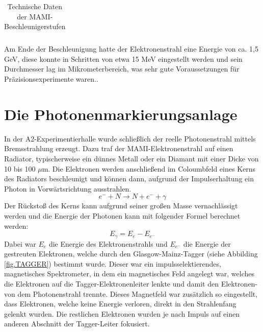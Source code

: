 \documentclass[a4paper,11pt,oneside,final,german,openbib,pdftex]{scrbook}
\begin{document}
{\begin{table}[h!]
\begin{center}
\begin{tabular}{|l|c|c|c|c|}
	
		\end{tabular}
		\caption{Technische Daten der MAMI-Beschleunigerstufen \cite{Un08}}
		\label{tab.MAMIstufen}
	\end{center}
\end{table}

 Am Ende der Beschleunigung hatte der Elektronenstrahl eine Energie von ca. 1,5 GeV, diese konnte in Schritten von etwa 15 MeV eingestellt werden und sein Durchmesser lag im Mikrometerbereich, was sehr gute Voraussetzungen f\"ur Pr\"azisionsexperimente waren.\cite{KPh07}. 
 
 
 \section{Die Photonenmarkierungsanlage}
 
 In der A2-Experimentierhalle wurde schlie{\ss}lich der reelle Photonenstrahl mittels Bremsstrahlung erzeugt. Dazu traf der MAMI-Elektronenstrahl auf einen Radiator, typischerweise ein d\"unnes Metall oder ein Diamant mit einer Dicke von 10 bis 100 $\mu$m. Die Elektronen werden anschlie{\ss}end im Coloumbfeld eines Kerns des Radiators beschleunigt und k\"onnen dann, aufgrund der Impulserhaltung ein Photon in Vorw\"artsrichtung ausstrahlen.
 \begin{equation}
 e^{-}+N\rightarrow N + e^{-}+\gamma
 \label{eq.Streuung}
 \end{equation}
  Der R\"ucksto{\ss} des Kerns kann aufgrund seiner gro{\ss}en Masse vernachl\"assigt werden und die Energie der Photonen kann mit folgender Formel berechnet werden:
  \begin{equation}
  E_{\gamma}= E_{e^{}}-E_{e^-}
  \label{eq.Photonenenergie}
  \end{equation}
 Dabei war $E_e$ die Energie des Elektronenstrahls und $E_{e^-}$ die Energie der gestreuten Elektronen, welche durch den Glasgow-Mainz-Tagger (siehe Abbilding \ref{fig.TAGGER}) bestimmt wurde.
 Dieser war ein impulsselektierendes, magnetisches Spektrometer, in dem ein magnetisches Feld angelegt war, welches die Elektronen auf die Tagger-Elektronenleiter lenkte und damit den Elektronen- von dem Photonenstrahl trennte. Dieses Magnetfeld war zus\"atzlich so eingestellt, dass Elektronen, welche keine Energie verloren, direkt in den Strahlenfang gelenkt wurden. Die restlichen Elektronen wurden je nach Impuls auf einen anderen Abschnitt der Tagger-Leiter fokusiert.
 
}
\end{document}
